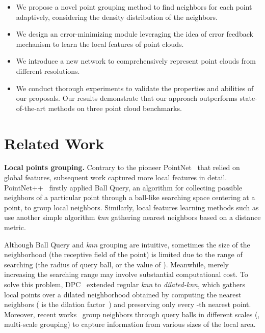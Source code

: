 \documentclass[10pt,twocolumn,letterpaper]{article}
\begin{document}
\begin{itemize}
\item We propose a novel point grouping method to find neighbors for each point adaptively, considering the density distribution of the neighbors.
\item We design an error-minimizing module leveraging the idea of error feedback mechanism to learn the local features of point clouds.
\item We introduce a new network to comprehensively represent point clouds from different resolutions.
\item We conduct thorough experiments to validate the properties and abilities of our proposals. Our results demonstrate that our approach outperforms state-of-the-art methods on three point cloud benchmarks.
\end{itemize}

\section{Related Work}
\label{sec:work}
\noindent \textbf{Local points grouping.} Contrary to the pioneer PointNet~\cite{qi2017pointnet} that relied on global features, subsequent work captured more local features in detail. PointNet++~\cite{qi2017pointnet++} firstly applied Ball Query, an algorithm for collecting possible neighbors of a particular point through a ball-like searching space centering at a point, to group local neighbors. Similarly, local features learning methods such as \cite{wang2019dynamic, engelmann2019dilated, qiu2019geometric} use another simple algorithm \emph{knn} gathering nearest neighbors based on a distance metric. 

Although Ball Query and \emph{knn} grouping are intuitive, sometimes the size of the neighborhood (\ie the receptive field of the point) is limited due to the range of searching (\ie the radius of query ball, or the value of ). Meanwhile, merely increasing the searching range may involve substantial computational cost. To solve this problem, DPC~\cite{engelmann2019dilated} extended regular \emph{knn} to \emph{dilated-knn}, which gathers local points over a dilated neighborhood obtained by computing the  nearest neighbors ( is the dilation factor~\cite{yu2015multi}) and preserving only every -th nearest point. Moreover, recent works~\cite{qi2017pointnet++, liu2019relation, yan2020pointasnl} group neighbors through query balls in different scales (\eg, multi-scale grouping) to capture information from various sizes of the local area.
\end{document}

